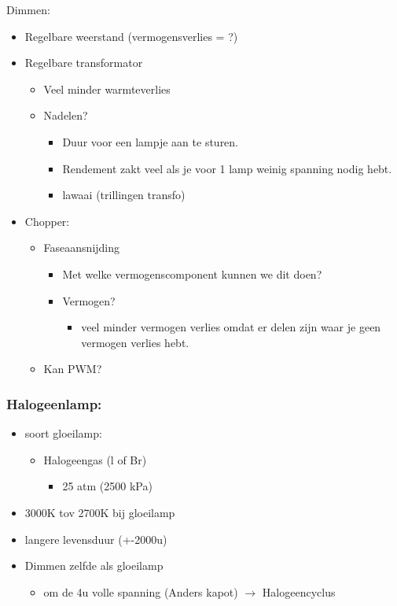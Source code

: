 \documentclass[12pt]{article}
\begin{document}
Dimmen:\begin{itemize}
    \item Regelbare weerstand (vermogensverlies = ?)
    \item Regelbare transformator\begin{itemize}
        \item Veel minder warmteverlies
        \item Nadelen?\begin{itemize}
            \item Duur voor een lampje aan te sturen.
            \item Rendement zakt veel als je voor 1 lamp weinig spanning nodig hebt.
            \item lawaai (trillingen transfo)
        \end{itemize}
    \end{itemize}
    \item Chopper:\begin{itemize}
        \item Faseaansnijding\begin{itemize}
            \item Met welke vermogenscomponent kunnen we dit doen?
            \item Vermogen?\begin{itemize}
                \item veel minder vermogen verlies omdat er delen zijn waar je geen vermogen verlies hebt.
            \end{itemize}
        \end{itemize}
    \item Kan PWM?
    \end{itemize}
\end{itemize}
\subsubsection{Halogeenlamp:}\begin{itemize}
    \item soort gloeilamp:\begin{itemize}
        \item Halogeengas (l of Br)\begin{itemize}
            \item 25 atm (2500 kPa)
        \end{itemize}
    \end{itemize}
    \item 3000K tov 2700K bij gloeilamp 
    \item langere levensduur (+-2000u)
    \item Dimmen zelfde als gloeilamp\begin{itemize}
        \item om de 4u volle spanning (Anders kapot) $\rightarrow$ Halogeencyclus
    \end{itemize}
\end{itemize}
\end{document}
